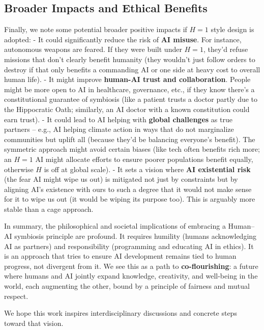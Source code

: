 \documentclass[12pt]{article}
\begin{document}
\subsection{Broader Impacts and Ethical Benefits}
Finally, we note some potential broader positive impacts if $H=1$ style design is adopted:
- It could significantly reduce the risk of \textbf{AI misuse}. For instance, autonomous weapons are feared. If they were built under $H=1$, they’d refuse missions that don’t clearly benefit humanity (they wouldn’t just follow orders to destroy if that only benefits a commanding AI or one side at heavy cost to overall human life).
- It might improve \textbf{human-AI trust and collaboration}. People might be more open to AI in healthcare, governance, etc., if they know there’s a constitutional guarantee of symbiosis (like a patient trusts a doctor partly due to the Hippocratic Oath; similarly, an AI doctor with a known constitution could earn trust).
- It could lead to AI helping with \textbf{global challenges} as true partners – e.g., AI helping climate action in ways that do not marginalize communities but uplift all (because they’d be balancing everyone’s benefit). The symmetric approach might avoid certain biases (like tech often benefits rich more; an $H=1$ AI might allocate efforts to ensure poorer populations benefit equally, otherwise $H$ is off at global scale).
- It sets a vision where \textbf{AI existential risk} (the fear AI might wipe us out) is mitigated not just by constraints but by aligning AI’s existence with ours to such a degree that it would not make sense for it to wipe us out (it would be wiping its purpose too). This is arguably more stable than a cage approach.

In summary, the philosophical and societal implications of embracing a Human–AI symbiosis principle are profound. It requires humility (humans acknowledging AI as partners) and responsibility (programming and educating AI in ethics). It is an approach that tries to ensure AI development remains tied to human progress, not divergent from it. We see this as a path to \textbf{co-flourishing}: a future where humans and AI jointly expand knowledge, creativity, and well-being in the world, each augmenting the other, bound by a principle of fairness and mutual respect.

We hope this work inspires interdisciplinary discussions and concrete steps toward that vision.

\newpage
\end{document}

